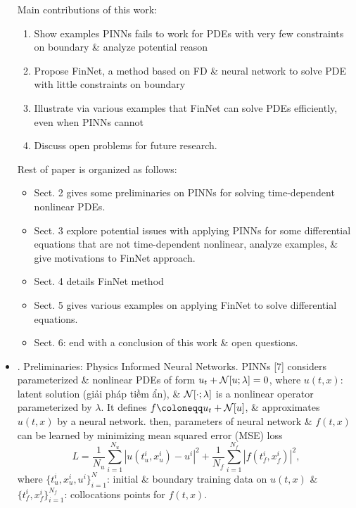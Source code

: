 \documentclass{article}
\begin{document}
\begin{itemize}
	Main contributions of this work:
	\begin{enumerate}
		\item Show examples PINNs fails to work for PDEs with very few constraints on boundary \& analyze potential reason
		\item Propose FinNet, a method based on FD \& neural network to solve PDE with little constraints on boundary
		\item Illustrate via various examples that FinNet can solve PDEs efficiently, even when PINNs cannot
		\item Discuss open problems for future research.
	\end{enumerate}
	Rest of paper is organized as follows:
	\begin{itemize}
		\item Sect. 2 gives some preliminaries on PINNs for solving time-dependent nonlinear PDEs.
		\item Sect. 3 explore potential issues with applying PINNs for some differential equations that are not time-dependent nonlinear, analyze examples, \& give motivations to FinNet approach.
		\item Sect. 4 details FinNet method
		\item Sect. 5 gives various examples on applying FinNet to solve differential equations.
		\item Sect. 6: end with a conclusion of this work \& open questions.
	\end{itemize}
	\item {. Preliminaries: Physics Informed Neural Networks.} PINNs [7] considers parameterized \& nonlinear PDEs of form $u_t + {\cal N}[u;\lambda] = 0$, where $u(t,x)$: latent solution (giải pháp tiềm ẩn), \& ${\cal N}[\cdot;\lambda]$ is a nonlinear operator parameterized by $\lambda$. It defines $f\coloneqq u_t + {\cal N}[u]$, \& approximates $u(t,x)$ by a neural network. then, parameters of neural network \& $f(t,x)$ can be learned by minimizing mean squared error (MSE) loss
	\begin{equation*}
		L = \frac{1}{N_u}\sum_{i=1}^{N_u} |u(t_u^i,x_u^i) - u^i|^2 + \frac{1}{N_f}\sum_{i=1}^{N_f} |f(t_f^i,x_f^i)|^2,
	\end{equation*}
	where $\{t_u^i,x_u^i,u^i\}_{i=1}^N$: initial \& boundary training data on $u(t,x)$ \& $\{t_f^i,x_f^i\}_{i=1}^{N_f}$: collocations points for $f(t,x)$.


\end{itemize}
\end{document}
